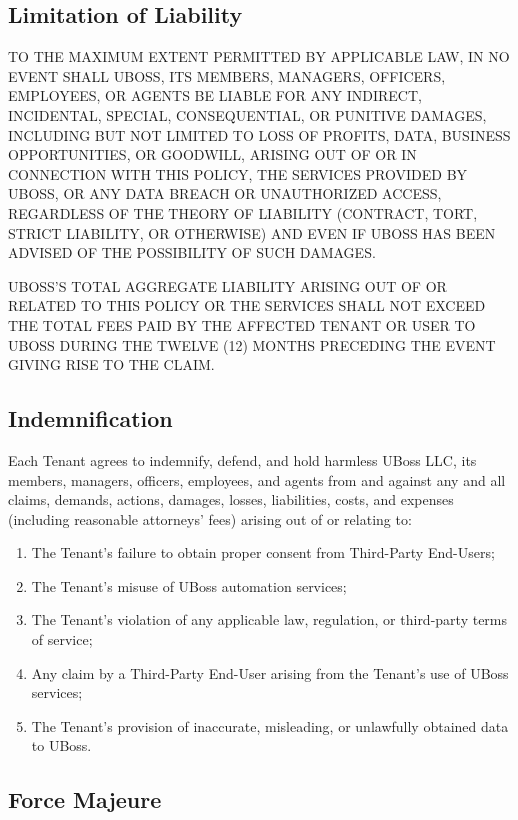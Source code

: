 \documentclass[11pt, letterpaper]{article}
\begin{document}
\subsection{Limitation of Liability}

TO THE MAXIMUM EXTENT PERMITTED BY APPLICABLE LAW, IN NO EVENT SHALL UBOSS, ITS
MEMBERS, MANAGERS, OFFICERS, EMPLOYEES, OR AGENTS BE LIABLE FOR ANY INDIRECT,
INCIDENTAL, SPECIAL, CONSEQUENTIAL, OR PUNITIVE DAMAGES, INCLUDING BUT NOT LIMITED TO
LOSS OF PROFITS, DATA, BUSINESS OPPORTUNITIES, OR GOODWILL, ARISING OUT OF OR IN
CONNECTION WITH THIS POLICY, THE SERVICES PROVIDED BY UBOSS, OR ANY DATA BREACH OR
UNAUTHORIZED ACCESS, REGARDLESS OF THE THEORY OF LIABILITY (CONTRACT, TORT, STRICT
LIABILITY, OR OTHERWISE) AND EVEN IF UBOSS HAS BEEN ADVISED OF THE POSSIBILITY OF
SUCH DAMAGES.

UBOSS'S TOTAL AGGREGATE LIABILITY ARISING OUT OF OR RELATED TO THIS POLICY OR THE
SERVICES SHALL NOT EXCEED THE TOTAL FEES PAID BY THE AFFECTED TENANT OR USER TO
UBOSS DURING THE TWELVE (12) MONTHS PRECEDING THE EVENT GIVING RISE TO THE CLAIM.

\subsection{Indemnification}

Each Tenant agrees to indemnify, defend, and hold harmless UBoss LLC, its members,
managers, officers, employees, and agents from and against any and all claims, demands,
actions, damages, losses, liabilities, costs, and expenses (including reasonable
attorneys' fees) arising out of or relating to:

\begin{enumerate}
    \item The Tenant's failure to obtain proper consent from Third-Party End-Users;
    \item The Tenant's misuse of UBoss automation services;
    \item The Tenant's violation of any applicable law, regulation, or third-party terms
          of service;
    \item Any claim by a Third-Party End-User arising from the Tenant's use of UBoss
          services;
    \item The Tenant's provision of inaccurate, misleading, or unlawfully obtained data
          to UBoss.
\end{enumerate}

\subsection{Force Majeure}
\end{document}
